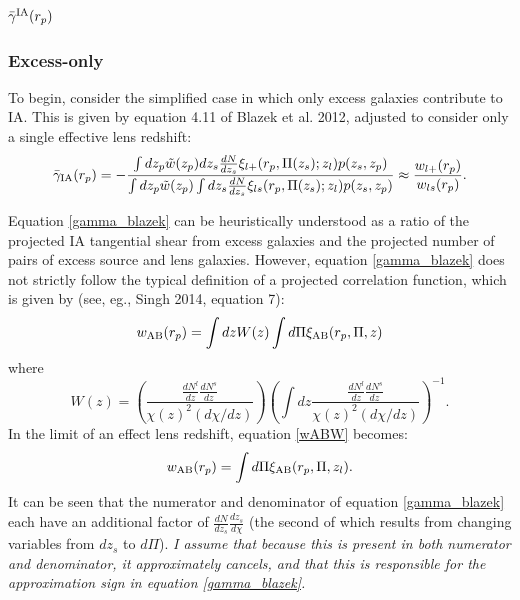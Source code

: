 \documentclass[onecolumn,amsmath,aps,fleqn, superscriptaddress]{revtex4}
\begin{document}
\subsection{$\bar{\gamma}^{\rm IA}(r_p)$}
\subsubsection*{Excess-only}
To begin, consider the simplified case in which only excess galaxies contribute to IA. This is given by equation 4.11 of Blazek et al. 2012, adjusted to consider only a single effective lens redshift:
\begin{equation}
\bar{\gamma}_{\rm IA}(r_p) = -\frac{\int dz_p \tilde{w}(z_p) dz_s \frac{dN}{dz_s} \xi_{l+}(r_p, \Pi(z_s); z_l) p(z_s, z_p)}{\int dz_p \tilde{w}(z_p) \int dz_s \frac{dN}{dz_s} \xi_{ls}(r_p, \Pi(z_s); z_l) p(z_s, z_p)} \approx \frac{w_{l+}(r_p)}{w_{ls}(r_p)}.
\label{gamma_blazek}
\end{equation} 

Equation \ref{gamma_blazek} can be heuristically understood as a ratio of the projected IA tangential shear from excess galaxies and the projected number of pairs of excess source and lens galaxies. However, equation \ref{gamma_blazek} does not strictly follow the typical definition of a projected correlation function, which is given by (see, eg., Singh 2014, equation 7):
\begin{equation}
w_{\rm AB}(r_p) = \int dz W(z) \int d\Pi \xi_{\rm AB}(r_p, \Pi, z)
\label{wABW}
\end{equation}
where 
\begin{equation}
W(z) = \left(\frac{\frac{dN^l}{dz}\frac{dN^s}{dz}}{\chi(z)^2 (d\chi/dz)}\right) \left(\int dz \frac{\frac{dN^l}{dz}\frac{dN^s}{dz}}{\chi(z)^2 (d\chi/dz)}\right)^{-1}.
\label{wz}
\end{equation}
In the limit of an effect lens redshift, equation \ref{wABW} becomes:
\begin{equation}
w_{\rm AB}(r_p) = \int d\Pi \xi_{\rm AB}(r_p, \Pi, z_l).
\label{wAB}
\end{equation}
It can be seen that the numerator and denominator of equation \ref{gamma_blazek} each have an additional factor of $\frac{dN}{dz_s}\frac{dz_s}{d\chi}$ (the second of which results from changing variables from $dz_s$ to $d\Pi$). {\it I assume that because this is present in both numerator and denominator, it approximately cancels, and that this is responsible for the approximation sign in equation \ref{gamma_blazek}.} 
\end{document}
